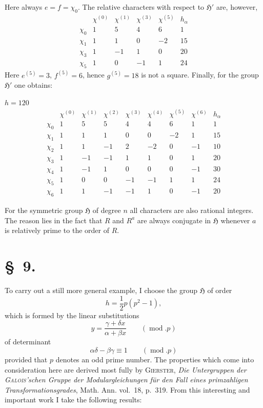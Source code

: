 \documentclass[11pt]{article}
\newcommand{\grp}{\mathfrak{H}}
\begin{document}
Here always $e=f=\chi_0$. The relative characters with respect to $\grp'$ are, however,
\[
\begin{array}{c|rrrr|r}
 & \chi^{(0)} & \chi^{(1)} & \chi^{(3)} & \chi^{(5)} & h_\alpha\\ \hline
\chi_0 & 1 & 5 & 4 & 6 & 1\\
\chi_1 & 1 & 1 & 0 & -2 & 15\\
\chi_3 & 1 & -1 & 1 & 0 & 20\\
\chi_5 & 1 & 0 & -1 & 1 & 24
\end{array}
\]
Here $e^{(5)}=3$, $f^{(5)}=6$, hence $g^{(5)}=18$ is not a square. Finally, for the group $\grp'$ one obtains:

\begin{center}
$h=120$
\[
\begin{array}{c|rrrrrrr|r}
 & \chi^{(0)} & \chi^{(1)} & \chi^{(2)} & \chi^{(3)} & \chi^{(4)} & \chi^{(5)} & \chi^{(6)} & h_\alpha\\ \hline
\chi_0 & 1 & 5 & 5 & 4 & 4 & 6 & 1 & 1\\
\chi_1 & 1 & 1 & 1 & 0 & 0 & -2 & 1 & 15\\
\chi_2 & 1 & 1 & -1 & 2 & -2 & 0 & -1 & 10\\
\chi_3 & 1 & -1 & -1 & 1 & 1 & 0 & 1 & 20\\
\chi_4 & 1 & -1 & 1 & 0 & 0 & 0 & -1 & 30\\
\chi_5 & 1 & 0 & 0 & -1 & -1 & 1 & 1 & 24\\
\chi_6 & 1 & 1 & -1 & -1 & 1 & 0 & -1 & 20
\end{array}
\]
\end{center}

For the symmetric group $\grp$ of degree $n$ all characters are also rational integers. The reason lies in the fact that $R$ and $R^a$ are always conjugate in $\grp$ whenever $a$ is relatively prime to the order of $R$.

\section*{\S~9.}

To carry out a still more general example, I choose the group $\grp$ of order
\begin{equation*}\tag{1.}
h=\frac{1}{2}p(p^2-1),
\end{equation*}
which is formed by the linear substitutions
\begin{equation*}\tag{2.}
y=\frac{\gamma+\delta x}{\alpha+\beta x}\qquad(\operatorname{mod}.p)
\end{equation*}
of determinant
\begin{equation*}\tag{3.}
\alpha\delta-\beta\gamma\equiv 1\qquad(\operatorname{mod}.p)
\end{equation*}
provided that $p$ denotes an odd prime number. The properties which come into consideration here are derived most fully by \textsc{Gierster}, \emph{Die Untergruppen der \textsc{Galois}'schen Gruppe der Modulargleichungen für den Fall eines primzahligen Transformationsgrades}, Math. Ann. vol.~18, p.~319. From this interesting and important work I take the following results:
\end{document}
